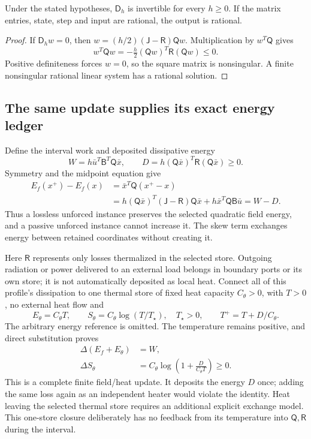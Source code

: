 \begin{proposition}
Under the stated hypotheses, $\mathsf D_h$ is invertible for every $h\ge0$.
If the matrix entries, state, step and input are rational, the output is rational.
\end{proposition}
\begin{proof}
If $\mathsf D_hw=0$, then $w=(h/2)(\mathsf J-\mathsf R)\mathsf Qw$.
Multiplication by $w^T\mathsf Q$ gives
\[
 w^T\mathsf Qw=-\tfrac h2(\mathsf Qw)^T\mathsf R(\mathsf Qw)\le0.
\]
Positive definiteness forces $w=0$, so the square matrix is nonsingular.
A finite nonsingular rational linear system has a rational solution.
\end{proof}

\subsection{The same update supplies its exact energy ledger}
Define the interval work and deposited dissipative energy
\begin{equation}
 W=h\bar u^T\mathsf B^T\mathsf Q\bar x,\qquad
 D=h(\mathsf Q\bar x)^T\mathsf R(\mathsf Q\bar x)\ge0.
 \label{eq:r14-field-ledger}
\end{equation}
Symmetry and the midpoint equation give
\begin{align}
 E_f(x^+)-E_f(x)
 &=\bar x^T\mathsf Q(x^+-x)\nonumber\\
 &=h(\mathsf Q\bar x)^T(\mathsf J-\mathsf R)\mathsf Q\bar x
   +h\bar x^T\mathsf Q\mathsf B\bar u=W-D.
 \label{eq:r14-field-energy}
\end{align}
Thus a lossless unforced instance preserves the selected quadratic field
energy, and a passive unforced instance cannot increase it. The skew term
exchanges energy between retained coordinates without creating it.

Here $\mathsf R$ represents only losses thermalized in the selected store.
Outgoing radiation or power delivered to an external load belongs in boundary
ports or its own store; it is not automatically deposited as local heat.
Connect all of this profile's dissipation to one thermal store of fixed heat
capacity $C_\theta>0$, with $T>0$, no external heat flow and
\begin{equation}
 E_\theta=C_\theta T,\qquad
 S_\theta=C_\theta\log(T/T_\star),\quad T_\star>0,\qquad
 T^+=T+D/C_\theta.
 \label{eq:r14-field-thermal}
\end{equation}
The arbitrary energy reference is omitted. The temperature remains positive,
and direct substitution proves
\begin{align}
 \Delta(E_f+E_\theta)&=W,\nonumber\\
 \Delta S_\theta&=C_\theta\log\left(1+\frac{D}{C_\theta T}\right)\ge0.
 \label{eq:r14-field-total}
\end{align}
This is a complete finite field/heat update. It deposits the energy $D$ once;
adding the same loss again as an independent heater would violate the identity.
Heat leaving the selected thermal store requires an additional explicit
exchange model. This one-store closure deliberately has no feedback from its
temperature into $\mathsf Q,\mathsf R$ during the interval.

